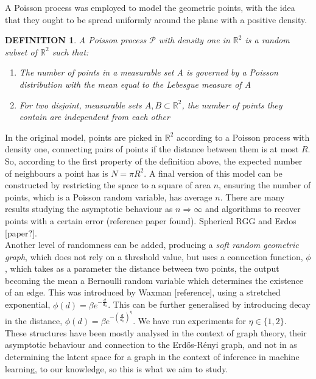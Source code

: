 \documentclass[12pt]{report}
\newtheorem{definition}[theorem]{DEFINITION}
\newcommand{\mc}[1]{\mathcal{#1}}
\newcommand{\mb}[1]{\mathbb{#1}}
\begin{document}
A Poisson process was employed to model the geometric points, with the idea that they ought to be spread uniformly around the plane with a positive density. \\

\begin{definition}
    A Poisson process $\mc{P}$ with density one in $\mb{R}^2$ is a random subset of $\mb{R}^2$ such that:
    \begin{enumerate}
        \item The number of points in a measurable set A is governed by a Poisson distribution with the mean equal to the Lebesgue measure of A
        \item For two disjoint, measurable sets $A, B \subset \mb{R}^2$, the number of points they contain are independent from each other \\
    \end{enumerate}
\end{definition}

In the original model, points are picked in $\mb{R}^2$ according to a Poisson process with density one, connecting pairs of points if the distance between them is at most $R$. So, according to the first property of the definition above, the expected number of neighbours a point has is $N = \pi R^2$. A final version of this model can be constructed by restricting the space to a square of area $n$, ensuring the number of points, which is a Poisson random variable, has average $n$. There are many results studying the asymptotic behaviour as $n \Rightarrow \infty$ and algorithms to recover points with a certain error (reference paper found). Spherical RGG and Erdos [paper?].\\

Another level of randomness can be added, producing a \textit{soft random geometric graph}, which does not rely on a threshold value, but uses a connection function, $\phi$, which takes as a parameter the distance between two points, the output becoming the mean a Bernoulli random variable which determines the existence of an edge. This was introduced by Waxman [reference], using a stretched exponential, $\phi(d) = \beta e^{-\frac{d}{d_0}}$. This can be further generalised by introducing decay in the distance, $\phi(d) = \beta e^{-\left(\frac{d}{d_0}\right)^\eta}$. We have run experiments for $\eta \in \{1, 2\}$. \\

These structures have been mostly analysed in the context of graph theory, their asymptotic behaviour and connection to the Erd\H{o}s-R\'{e}nyi graph, and not in as determining the latent space for a graph in the context of inference in machine learning, to our knowledge, so this is what we aim to study.
\end{document}
